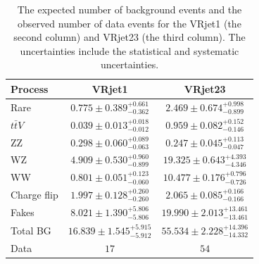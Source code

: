\begin{table}[htbp]
\begin{center}
\begin{tabular}{|l|c|c|}
\hline
\hline
Process & VRjet1 & VRjet23 \\
\hline
\hline
Rare        & $0.775\pm 0.389^{+0.661}_{-0.362}$ & $2.469 \pm 0.674^{+0.998} _{-0.899}$ \\
$t\bar{t}V$ & $0.039\pm 0.013^{+0.018}_{-0.012}$ & $0.959 \pm 0.082^{+0.152} _{-0.146}$ \\
ZZ          & $0.298\pm 0.060^{+0.089}_{-0.063}$ & $0.247 \pm 0.045^{+0.113} _{-0.047}$ \\
WZ          & $4.909\pm 0.530^{+0.960}_{-0.899}$ & $19.325\pm 0.643^{+4.393} _{-4.346}$ \\
WW          & $0.801\pm 0.051^{+0.123}_{-0.060}$ & $10.477\pm 0.176^{+0.796} _{-0.726}$ \\
Charge flip & $1.997\pm 0.128^{+0.260}_{-0.260}$ & $2.065 \pm 0.085^{+0.166} _{-0.166}$ \\
Fakes       & $8.021\pm 1.390^{+5.806}_{-5.806}$ & $19.990\pm 2.013^{+13.461}_{-13.461}$ \\
\hline
Total BG      & $16.839\pm 1.545^{+5.915}_{-5.912}$ & $55.534\pm 2.228^{+14.396}_{-14.332}$ \\
\hline
\hline
Data        & $17$ & $54$ \\
\hline
\hline
\end{tabular}
\caption{The expected number of background events and the observed number of data events for the VRjet1 (the second column) and VRjet23 (the third column). The uncertainties include the statistical and systematic uncertainties.}
\label{tab:VR_yields}
\end{center}
\end{table}

